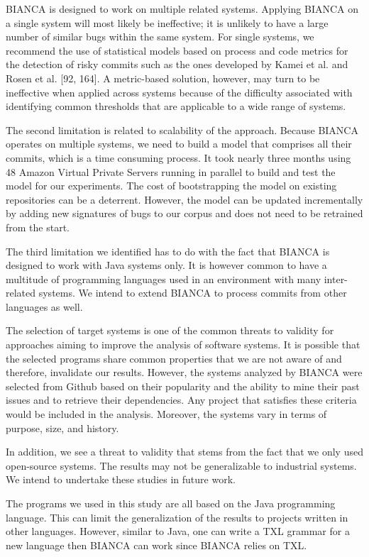\documentclass[12pt]{report}
\begin{document}
BIANCA is designed to work on multiple related systems. Applying BIANCA
on a single system will most likely be ineffective; it is unlikely to
have a large number of similar bugs within the same system. For single
systems, we recommend the use of statistical models based on process and
code metrics for the detection of risky commits such as the ones
developed by Kamei et al. and Rosen et al. {[}92, 164{]}. A metric-based
solution, however, may turn to be ineffective when applied across
systems because of the difficulty associated with identifying common
thresholds that are applicable to a wide range of systems.

The second limitation is related to scalability of the approach. Because
BIANCA operates on multiple systems, we need to build a model that
comprises all their commits, which is a time consuming process. It took
nearly three months using 48 Amazon Virtual Private Servers running in
parallel to build and test the model for our experiments. The cost of
bootstrapping the model on existing repositories can be a deterrent.
However, the model can be updated incrementally by adding new signatures
of bugs to our corpus and does not need to be retrained from the start.

The third limitation we identified has to do with the fact that BIANCA
is designed to work with Java systems only. It is however common to have
a multitude of programming languages used in an environment with many
inter-related systems. We intend to extend BIANCA to process commits
from other languages as well.

The selection of target systems is one of the common threats to validity
for approaches aiming to improve the analysis of software systems. It is
possible that the selected programs share common properties that we are
not aware of and therefore, invalidate our results. However, the systems
analyzed by BIANCA were selected from Github based on their popularity
and the ability to mine their past issues and to retrieve their
dependencies. Any project that satisfies these criteria would be
included in the analysis. Moreover, the systems vary in terms of
purpose, size, and history.

In addition, we see a threat to validity that stems from the fact that
we only used open-source systems. The results may not be generalizable
to industrial systems. We intend to undertake these studies in future
work.

The programs we used in this study are all based on the Java programming
language. This can limit the generalization of the results to projects
written in other languages. However, similar to Java, one can write a
TXL grammar for a new language then BIANCA can work since BIANCA relies
on TXL.
\end{document}
